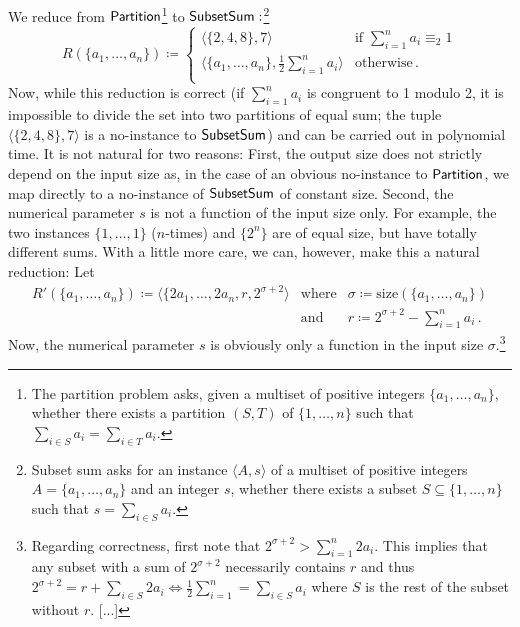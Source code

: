 \documentclass[11pt]{article}
\begin{document}
\begin{example}
  We reduce from
  $\mathsf{Partition}$\footnote{The partition problem asks, given a multiset
  of positive integers $\{a_1, \dots, a_n\}$, whether there exists a partition
  $(S,T)$ of $\{1, \dots, n\}$ such that
  $\sum_{i \in S} a_i = \sum_{i \in T} a_i$.}
  to
  $\mathsf{SubsetSum}:$\footnote{Subset sum asks for an instance
  $\langle A, s \rangle$ of a multiset of positive integers
  $A = \{a_1, \dots, a_n\}$ and an integer $s$, whether there exists a subset
  $S \subseteq \{1, \dots, n\}$ such that
  $s = \sum_{i \in S} a_i$.}
  \[
    R(\{a_1, \dots, a_n\}) \coloneqq
    \left\{
      \begin{array}{ll}
        \langle \{2, 4, 8\}, 7 \rangle
          & \textrm{if } \sum_{i=1}^n a_i \equiv_2 1 \\
        \langle \{a_1, \dots, a_n\}, \frac 1 2 \sum_{i=1}^n a_i \rangle
          & \textrm{otherwise} \,. \\
      \end{array}
    \right.
  \]
  Now, while this reduction is correct (if $\sum_{i=1}^n a_i$ is congruent to 1
  modulo 2, it is impossible to divide the set into two partitions of equal sum;
  the tuple $\langle \{2, 4, 8\}, 7 \rangle$ is a no-instance to
  $\mathsf{SubsetSum}$) and can be carried out in polynomial time.
  It is not natural for two reasons:
  First, the output size does not strictly depend on the input size as, in the
  case of an obvious no-instance to $\mathsf{Partition}$, we map directly to a
  no-instance of $\mathsf{SubsetSum}$ of constant size.
  Second, the numerical parameter $s$ is not a function of the input
  size only. For example, the two instances $\{1, \dots, 1\}$ ($n$-times) and
  $\{2^n\}$ are of equal size, but have totally different sums.
  With a little more care, we can, however, make this a natural reduction: Let
  \[
    \begin{array}{rrl}
      R'(\{a_1, \dots, a_n\}) \coloneqq
        \langle \{2 a_1, \dots, 2 a_n, r,
         2^{\sigma+2} \rangle
      &\textrm{where}&
      \sigma \coloneqq \mathrm{size}(\{a_1, \dots, a_n\}) \\
      &\textrm{and}&
      r \coloneqq 2^{\sigma+2} - \sum_{i=1}^n a_i \,.
    \end{array}
  \]
  Now, the numerical parameter $s$ is obviously only a function in the input
  size $\sigma$.\footnote{Regarding correctness, first note that
  $2^{\sigma+2} > \sum_{i=1}^n 2 a_i$. This implies that any subset with a sum
  of $2^{\sigma+2}$ necessarily contains $r$ and thus
  $
    \textstyle
    2^{\sigma+2} = r + \sum_{i \in S} 2a_i
    \iff
    \frac 1 2 \sum_{i=1}^n = \sum_{i \in S} a_i
  $
  where $S$ is the rest of the subset without $r$.
  [...]}
\end{example}
\end{document}
